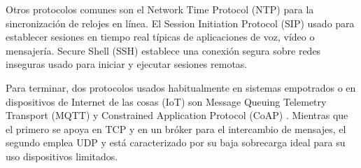 \begin{description}
  Otros protocolos comunes son el Network Time Protocol (NTP) \cite{rfc5905}
  para la sincronización de relojes en línea. El Session Initiation Protocol
  (SIP) \cite{rfc3261} usado para establecer sesiones en tiempo real típicas de
  aplicaciones de voz, vídeo o mensajería. Secure Shell (SSH) \cite{rfc4253}
  establece una conexión segura sobre redes inseguras usado para iniciar y
  ejecutar sesiones remotas.

  Para terminar, dos protocolos usados habitualmente en sistemas empotrados o
  en dispositivos de Internet de las cosas (IoT) son Message Queuing Telemetry 
  Transport (MQTT) \cite{banks2015} y Constrained Application Protocol (CoAP)
  \cite{rfc7252}. Mientras que el primero se apoya en TCP y en un bróker para
  el intercambio de mensajes, el segundo emplea UDP y está caracterizado por su
  baja sobrecarga ideal para su uso dispositivos limitados.
\end{description}
